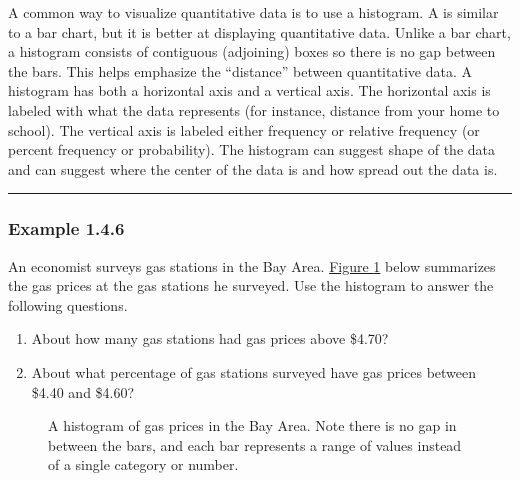 \documentclass[letterpaper,10pt,english]{jupyterBook}
\begin{document}
\sphinxAtStartPar
A common way to visualize quantitative data is to use a histogram. A  is similar to a bar chart, but it is better at displaying quantitative data. Unlike a bar chart, a histogram consists of contiguous (adjoining) boxes so there is no gap between the bars. This helps emphasize the “distance” between quantitative data. A histogram has both a horizontal axis and a vertical axis. The horizontal axis is labeled with what the data represents (for instance, distance from your home to school). The vertical axis is labeled either frequency or relative frequency (or percent frequency or probability). The histogram can suggest shape of the data and can suggest where the center of the data is and how spread out the data is.


\bigskip\hrule\bigskip



\subsubsection{Example 1.4.6}
\label{\detokenize{Ch1 Sampling and Data/1.4 Tables and Charts:example-1-4-6}}
\sphinxAtStartPar
An economist surveys gas stations in the Bay Area. \hyperref[\detokenize{Ch1 Sampling and Data/1.4 Tables and Charts:gas-hist}]{Figure \ref{\detokenize{Ch1 Sampling and Data/1.4 Tables and Charts:gas-hist}}} below summarizes the gas prices at the gas stations he surveyed. Use the histogram to answer the following questions.
\begin{enumerate}
%
\item {} 
\sphinxAtStartPar
About how many gas stations had gas prices above \$4.70?

\item {} 
\sphinxAtStartPar
About what percentage of gas stations surveyed have gas prices between \$4.40 and \$4.60?

\end{enumerate}

\begin{figure}[htbp]
\centering
\capstart

\noindent{}
\caption{A histogram of gas prices in the Bay Area. Note there is no gap in between the bars, and each bar represents a range of values instead of a single category or number.}\label{\detokenize{Ch1 Sampling and Data/1.4 Tables and Charts:gas-hist}}\end{figure}
\end{document}
